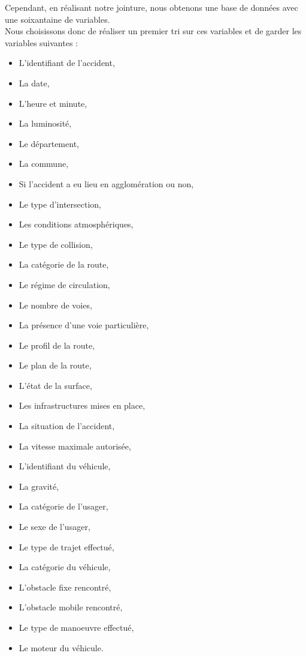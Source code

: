 \documentclass[french,]{tp}
\providecommand{\tightlist}{%
  \setlength{\itemsep}{0pt}\setlength{\parskip}{0pt}}
\begin{document}
Cependant, en réalisant notre jointure, nous obtenons une base de données avec une soixantaine de variables.\\
Nous choisissons donc de réaliser un premier tri sur ces variables et de garder les variables suivantes :

\begin{itemize}
\tightlist
\item
  L'identifiant de l'accident,
\item
  La date,
\item
  L'heure et minute,
\item
  La luminosité,
\item
  Le département,
\item
  La commune,
\item
  Si l'accident a eu lieu en agglomération ou non,
\item
  Le type d'intersection,
\item
  Les conditions atmosphériques,
\item
  Le type de collision,
\item
  La catégorie de la route,
\item
  Le régime de circulation,
\item
  Le nombre de voies,
\item
  La présence d'une voie particulière,
\item
  Le profil de la route,
\item
  Le plan de la route,
\item
  L'état de la surface,
\item
  Les infrastructures mises en place,
\item
  La situation de l'accident,
\item
  La vitesse maximale autorisée,
\item
  L'identifiant du véhicule,
\item
  La gravité,
\item
  La catégorie de l'usager,
\item
  Le sexe de l'usager,
\item
  Le type de trajet effectué,
\item
  La catégorie du véhicule,
\item
  L'obstacle fixe rencontré,
\item
  L'obstacle mobile rencontré,
\item
  Le type de manoeuvre effectué,
\item
  Le moteur du véhicule.
\end{itemize}
\end{document}

